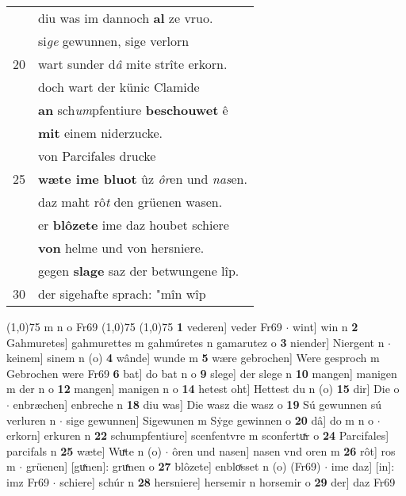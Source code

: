 \documentclass[8pt,a4paper,notitlepage]{article}
\begin{document}
\begin{table}[ht]
\begin{minipage}[t]{0.5\linewidth}
\begin{tabular}{rl}
 & diu was im dannoch \textbf{al} ze vruo.\\ 
 & si\textit{ge} gewunnen, sige verlorn\\ 
20 & wart sunder d\textit{â} mite strîte erkorn.\\ 
 & doch wart der künic Clamide\\ 
 & \textbf{an} sch\textit{um}pfentiure \textbf{beschouwet} ê\\ 
 & \textbf{mit} einem niderzucke.\\ 
 & von Parcifales drucke\\ 
25 & \textbf{wæte ime bluot} ûz \textit{ôr}en und \textit{nas}en.\\ 
 & daz maht rô\textit{t} den grüenen wasen.\\ 
 & er \textbf{blôzete} ime daz houbet schiere\\ 
 & \textbf{von} helme und von hersniere.\\ 
 & gegen \textbf{slage} saz der betwungene lîp.\\ 
30 & der sigehafte sprach: "mîn wîp\\ 
\end{tabular}
\scriptsize
\line(1,0){75} \newline
m n o Fr69 \newline
\line(1,0){75} \newline
\newline
\line(1,0){75} \newline
\textbf{1} vederen] veder Fr69  $\cdot$ wint] win n \textbf{2} Gahmuretes] gahmurettes m gahmúretes n gamarutez o \textbf{3} niender] Niergent n  $\cdot$ keinem] sinem n (o) \textbf{4} wânde] wunde m \textbf{5} wære gebrochen] Were gesproch m Gebrochen were Fr69 \textbf{6} bat] do bat n o \textbf{9} slege] der slege n \textbf{10} mangen] manigen m der n o \textbf{12} mangen] manigen n o \textbf{14} hetest oht] Hettest du n (o) \textbf{15} dir] Die o  $\cdot$ enbræchen] enbreche n \textbf{18} diu was] Die wasz die wasz o \textbf{19} Sú gewunnen sú verluren n  $\cdot$ sige gewunnen] Sigewunen m Sẏge gewinnen o \textbf{20} dâ] do m n o  $\cdot$ erkorn] erkuren n \textbf{22} schumpfentiure] scenfentvre m sconfertuͯr o \textbf{24} Parcifales] parcifals n \textbf{25} wæte] Wuͯte n (o)  $\cdot$ ôren und nasen] nasen vnd oren m \textbf{26} rôt] ros m  $\cdot$ grüenen] [guͯnen]: gruͯnen o \textbf{27} blôzete] enbloͯsset n (o) (Fr69)  $\cdot$ ime daz] [in]: imz Fr69  $\cdot$ schiere] schúr n \textbf{28} hersniere] hersemir n horsemir o \textbf{29} der] daz Fr69 \newline
\end{minipage}
\end{table}
\end{document}
